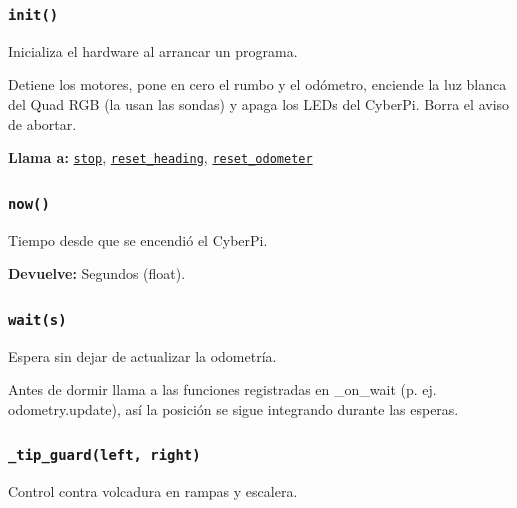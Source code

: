 \subsubsection{\texttt{init()}}\label{fn:hal:init}
\noindent Inicializa el hardware al arrancar un programa.

Detiene los motores, pone en cero el rumbo y el odómetro, enciende la luz blanca del Quad RGB (la usan las sondas) y apaga los LEDs del CyberPi. Borra el aviso de abortar.

\noindent\textbf{Llama a:} \hyperref[fn:hal:stop]{\texttt{stop}}, \hyperref[fn:hal:reset-heading]{\texttt{reset\_\allowbreak{}heading}}, \hyperref[fn:hal:reset-odometer]{\texttt{reset\_\allowbreak{}odometer}}\par

\subsubsection{\texttt{now()}}\label{fn:hal:now}
\noindent Tiempo desde que se encendió el CyberPi.

\noindent\textbf{Devuelve:} Segundos (float).\par

\subsubsection{\texttt{wait(s)}}\label{fn:hal:wait}
\noindent Espera sin dejar de actualizar la odometría.

Antes de dormir llama a las funciones registradas en \_on\_wait (p. ej. odometry.update), así la posición se sigue integrando durante las esperas.

\par{}\par\smallskip

\subsubsection{\texttt{\_\allowbreak{}tip\_\allowbreak{}guard(left, right)}}\label{fn:hal:-tip-guard}
\noindent Control contra volcadura en rampas y escalera.

